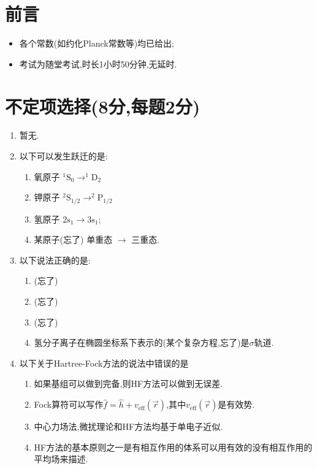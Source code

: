 \documentclass{ctexart}
\author{Glimmerium}
\date{}
\title{\tbf{2026年结构化学挑战班期中考试}}
\begin{document}
\maketitle
\section*{前言}
\begin{itemize}
    \item 各个常数(如约化Planck常数等)均已给出;
    \item 考试为随堂考试,时长1小时50分钟,无延时.
\end{itemize}
\section{不定项选择(8分,每题2分)}
\begin{enumerate}[label=\tbf{\arabic*.}]
    \item 暂无.
    \item 以下可以发生跃迁的是:
        \begin{enumerate}[label=\Alph*.]
            \item 氧原子 $^1\text{S}_0 \rightarrow ^1\text{D}_2$
            \item 钾原子 $^2\text{S}_{1/2} \rightarrow ^2\text{P}_{1/2}$
            \item 氢原子 $2\text{s}_{1}\rightarrow 3\text{s}_{1}$;
            \item 某原子(忘了) 单重态 $\rightarrow$ 三重态.
        \end{enumerate}
    \item 以下说法正确的是:
        \begin{enumerate}[label=\Alph*.]
            \item (忘了)
            \item (忘了)
            \item (忘了)
            \item 氢分子离子在椭圆坐标系下表示的(某个复杂方程,忘了)是$\sigma$轨道.
        \end{enumerate}
    \item 以下关于Hartree-Fock方法的说法中错误的是
        \begin{enumerate}[label=\Alph*.]
            \item 如果基组可以做到完备,则HF方法可以做到无误差.
            \item Fock算符可以写作$\hat{f}=\hat{h}+v_{\text{eff}}(\vec{r})$,其中$v_{\text{eff}}(\vec{r})$是有效势.
            \item 中心力场法,微扰理论和HF方法均基于单电子近似.
            \item HF方法的基本原则之一是有相互作用的体系可以用有效的没有相互作用的平均场来描述.
        \end{enumerate}
\end{enumerate}
\end{document}
